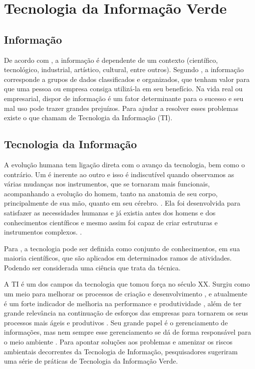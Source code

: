 %
%

\chapter{Tecnologia da Informação Verde}

\section{Informação}

De acordo com , a informação é dependente de um contexto (científico, tecnológico, industrial, artístico, cultural, entre outros). Segundo , a informação corresponde a grupos de dados classificados e organizados, que tenham valor para que uma pessoa ou empresa consiga utilizá-la em seu benefício. Na vida real ou empresarial, dispor de informação é um fator determinante para o sucesso e seu mal uso pode trazer grandes prejuízos. Para ajudar a resolver esses problemas existe o que chamam de Tecnologia da Informação (TI).

\section{Tecnologia da Informação}

A evolução humana tem ligação direta com o avanço da tecnologia, bem como o contrário. Um é inerente ao outro e isso é indiscutível quando observamos as várias mudanças nos instrumentos, que se tornaram mais funcionais, acompanhando a evolução do homem, tanto na anatomia de seu corpo, principalmente de sua mão, quanto em seu cérebro. \cite[p. 107-111]{acevedo1998ciencia}. Ela foi desenvolvida para satisfazer as necessidades humanas e já existia antes dos homens e dos conhecimentos científicos e mesmo assim foi capaz de criar estruturas e instrumentos complexos. \cite{acevedo1998ciencia, veraszto2004projeto}. 

Para , a tecnologia pode ser definida como conjunto de conhecimentos, em sua maioria científicos, que são aplicados em determinados ramos de atividades. Podendo ser considerada uma ciência que trata da técnica.

A TI é um dos campos da tecnologia que tomou força no século XX. Surgiu como um meio para melhorar os processos de criação e desenvolvimento \cite[p. 2]{de1996tecnologia}, e atualmente é um forte indicador de melhoria na performance e produtividade \cite[p. 2]{lunardi2001efeitos}, além de ter grande relevância na continuação de esforços das empresas para tornarem os seus processos mais ágeis e produtivos \cite{shaw1997information}. Seu grande papel é o gerenciamento de informações, mas nem sempre esse gerenciamento se dá de forma responsável para o meio ambiente \cite[p. 6-7]{silva2011}. Para apontar soluções aos problemas e amenizar os riscos ambientais decorrentes da Tecnologia de Informação, pesquisadores sugeriram uma série de práticas de Tecnologia da Informação Verde.

